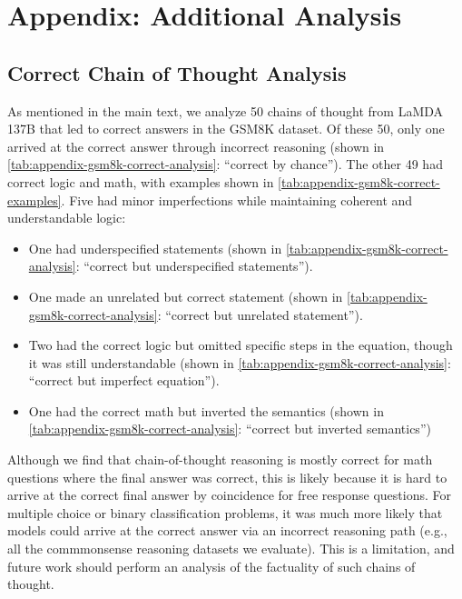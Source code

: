 \documentclass[]{article}
\theoremstyle{plain}
\theoremstyle{definition}
\theoremstyle{remark}
\newcommand{\lamda}[0]{LaMDA}
\begin{document}
\section{Appendix: Additional Analysis}

\subsection{Correct Chain of Thought Analysis}\label{subsec:correct-chain-of-thought}
As mentioned in the main text, we analyze 50 chains of thought from \lamda{} 137B that led to correct answers in the GSM8K dataset.
Of these 50, only one arrived at the correct answer through incorrect reasoning (shown in \cref{tab:appendix-gsm8k-correct-analysis}: ``correct by chance'').
The other 49 had correct logic and math, with examples shown in \cref{tab:appendix-gsm8k-correct-examples}.
Five had minor imperfections while maintaining coherent and understandable logic:
\begin{itemize}[leftmargin=*,topsep=0pt]
    \itemsep0em 
    \item One had underspecified statements (shown in \cref{tab:appendix-gsm8k-correct-analysis}: ``correct but underspecified statements''). 
    \item One made an unrelated but correct statement (shown in \cref{tab:appendix-gsm8k-correct-analysis}: ``correct but unrelated statement'').
    \item Two had the correct logic but omitted specific steps in the equation, though it was still understandable (shown in \cref{tab:appendix-gsm8k-correct-analysis}: ``correct but imperfect equation'').
    \item One had the correct math but inverted the semantics (shown in \cref{tab:appendix-gsm8k-correct-analysis}: ``correct but inverted semantics'')
\end{itemize}



Although we find that chain-of-thought reasoning is mostly correct for math questions where the final answer was correct, this is likely because it is hard to arrive at the correct final answer by coincidence for free response questions.
For multiple choice or binary classification problems, it was much more likely that models could arrive at the correct answer via an incorrect reasoning path (e.g., all the commmonsense reasoning datasets we evaluate). 
This is a limitation, and future work should perform an analysis of the factuality of such chains of thought.
\end{document}
